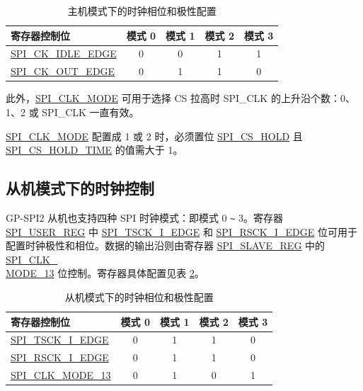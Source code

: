\documentclass[main\_\_CN.tex]{subfiles}
\begin{document}
\begin{table}[H]
    \centering
    \caption{主机模式下的时钟相位和极性配置}
    \label{tab:spi-clk-phase-polarity-config-master}
    \begin{tabular}[c]{|p{3.5cm}|c|c|c|c|}
    \hline
    \rowcolor{lightgray}
    寄存器控制位 & 模式 0 & 模式 1 & 模式 2 & 模式 3\\
    \hline
   \hyperref[fielddesc:SPICKIDLEEDGE]{SPI\_CK\_IDLE\_EDGE}  & 0     & 0     & 1     & 1\\
    \hline
   \hyperref[fielddesc:SPICKOUTEDGE]{SPI\_CK\_OUT\_EDGE}   & 0     & 1     & 1     & 0\\
    \hline
    \end{tabular}
\end{table}

此外，\hyperref[fielddesc:SPICLKMODE]{SPI\_CLK\_MODE} 可用于选择 CS 拉高时 SPI\_CLK 的上升沿个数：0、1、2 或 SPI\_CLK 一直有效。

\begin{tiplisting}
 \hyperref[fielddesc:SPICLKMODE]{SPI\_CLK\_MODE} 配置成 1 或 2 时，必须置位 \hyperref[fielddesc:SPICSHOLD]{SPI\_CS\_HOLD} 且 \hyperref[fielddesc:SPICSHOLDTIME]{SPI\_CS\_HOLD\_TIME} 的值需大于 1。
\end{tiplisting}
\vspace{-1em}

\subsection{从机模式下的时钟控制}\label{sec:spi-gp-spi2-clk-ctrl-slave}

GP-SPI2 从机也支持四种 SPI 时钟模式：即模式 0 \verb+~+ 3。寄存器 \hyperref[regdesc:SPIUSERREG]{SPI\_USER\_REG} 中 \hyperref[fielddesc:SPITSCKIEDGE]{SPI\_TSCK\_I\_EDGE} 和 \hyperref[fielddesc:SPIRSCKIEDGE]{SPI\_RSCK\_I\_EDGE} 位可用于配置时钟极性和相位。数据的输出沿则由寄存器 \hyperref[regdesc:SPISLAVEREG]{SPI\_SLAVE\_REG} 中的 \hyperref[fielddesc:SPICLKMODE13]{SPI\_CLK\_\\MODE\_13} 位控制。寄存器具体配置见表  \ref{tab:spi-clk-phase-polarity-config-slave}。

\begin{table}[H]
    \centering
    \caption{从机模式下的时钟相位和极性配置}
    \label{tab:spi-clk-phase-polarity-config-slave}
    \begin{tabular}[c]{|p{3.5cm}|c|c|c|c|}
    \hline
    \rowcolor{lightgray}
    寄存器控制位 & 模式 0 & 模式 1 & 模式 2 & 模式 3\\
    \hline
   \hyperref[fielddesc:SPITSCKIEDGE]{SPI\_TSCK\_I\_EDGE}   & 0 & 1 & 1 & 0\\
    \hline
   \hyperref[fielddesc:SPIRSCKIEDGE]{SPI\_RSCK\_I\_EDGE}   & 0 & 1 & 1 & 0\\
    \hline
   \hyperref[fielddesc:SPICLKMODE13]{SPI\_CLK\_MODE\_13}     & 0 & 1 & 0 & 1\\
    \hline
    \end{tabular}
\end{table}
\end{document}

